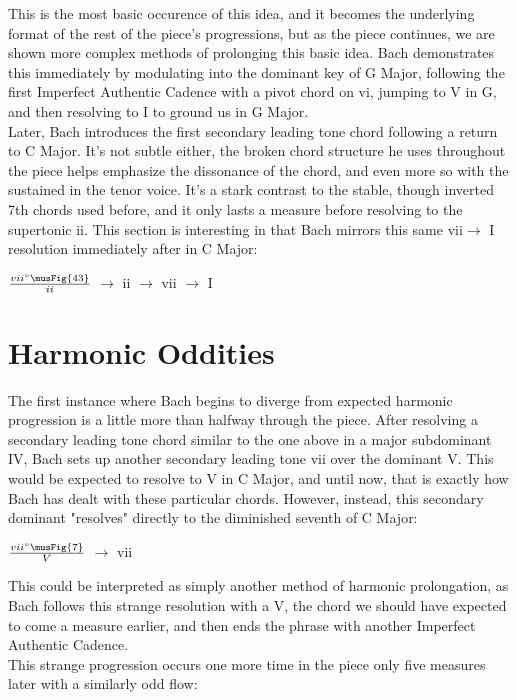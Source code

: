 \documentclass[a4paper,12pt]{report}
\begin{document}
\doublespacing
This is the most basic occurence of this idea, and it becomes the underlying format of the rest of the piece's progressions, but as the piece continues, we are shown more complex methods of prolonging this basic idea. Bach demonstrates this immediately by modulating into the dominant key of G Major, following the first Imperfect Authentic Cadence with a pivot chord on vi, jumping to V in G, and then resolving to I to ground us in G Major.\\
\doublespacing
\indent Later, Bach introduces the first secondary leading tone chord following a return to C Major. It's not subtle either, the broken chord structure he uses throughout the piece helps emphasize the dissonance of the chord, and even more so with the  sustained in the tenor voice. It's a stark contrast to the stable, though inverted 7th chords used before, and it only lasts a measure before resolving to the supertonic ii. This section is interesting in that Bach mirrors this same vii\textdegree $\rightarrow$ I resolution immediately after in C Major:

\begin{center}
$\frac{vii^{\circ}\musFig{4 3}}{ii}$ $\rightarrow$ ii $\rightarrow$ vii\textdegree{} $\rightarrow$ I \linebreak
\end{center}


\section*{Harmonic Oddities}
\doublespacing
The first instance where Bach begins to diverge from expected harmonic progression is a little more than halfway through the piece. After resolving a secondary leading tone chord similar to the one above in a major subdominant IV, Bach sets up another secondary leading tone vii\textdegree{} over the dominant V. This would be expected to resolve to V in C Major, and until now, that is exactly how Bach has dealt with these particular chords. However, instead, this secondary dominant "resolves" directly to the diminished seventh of C Major:

\begin{center}
$\frac{vii^{\circ}\musFig{7}}{V}$ $\rightarrow$ vii\textdegree{}
\end{center}

\doublespacing
This could be interpreted as simply another method of harmonic prolongation, as Bach follows this strange resolution with a V, the chord we should have expected to come a measure earlier, and then ends the phrase with another Imperfect Authentic Cadence. \\
\indent This strange progression occurs one more time in the piece only five measures later with a similarly odd flow:
\end{document}
